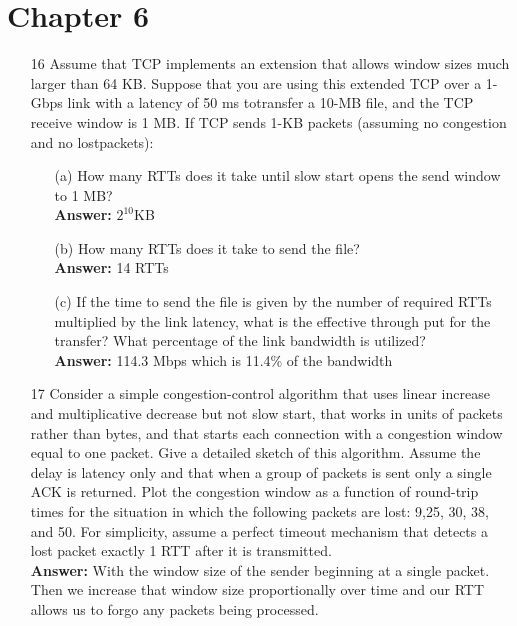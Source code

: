 \documentclass[a4paper]{article}
\begin{document}
\section*{Chapter 6}
\begin{itemize}
	\item[16] Assume that TCP implements an extension that allows window sizes much larger than 64 KB. Suppose that you are using this extended TCP over a 1-Gbps link with a latency of 50 ms totransfer a 10-MB file, and the TCP receive window is 1 MB. If TCP sends 1-KB packets (assuming no congestion and no lostpackets): \\
	      \begin{itemize}
	      	\item[(a)] How many RTTs does it take until slow start opens the send window to 1 MB? \\
	      	      \textbf{Answer:} $2^{10}$KB
	      	\item[(b)] How many RTTs does it take to send the file? \\
	      	      \textbf{Answer:} 14 RTTs
	      	\item[(c)] If the time to send the file is given by the number of required RTTs multiplied by the link latency, what is the effective through put for the transfer? What percentage of the link bandwidth is utilized? \\
	      	      \textbf{Answer:} 114.3 Mbps which is 11.4\% of the bandwidth
	      \end{itemize} 
	\item[17] Consider a simple congestion-control algorithm that uses linear increase and multiplicative decrease but not slow start, that works in units of packets rather than bytes, and that starts each connection with a congestion window equal to one packet. Give a detailed sketch of this algorithm. Assume the delay is latency only and that when a group of packets is sent only a single ACK is returned. Plot the congestion window as a function of round-trip times for the situation in which the following packets are lost: 9,25, 30, 38, and 50. For simplicity, assume a perfect timeout mechanism that detects a lost packet exactly 1 RTT after it is transmitted. \\
		  \textbf{Answer:} With the window size of the sender beginning at a single packet. Then we increase that window size proportionally over time and our RTT allows us to forgo any packets being processed. \\
		  \begin{tabular}{cccccc}

\end{tabular}
\end{itemize}
\end{document}
